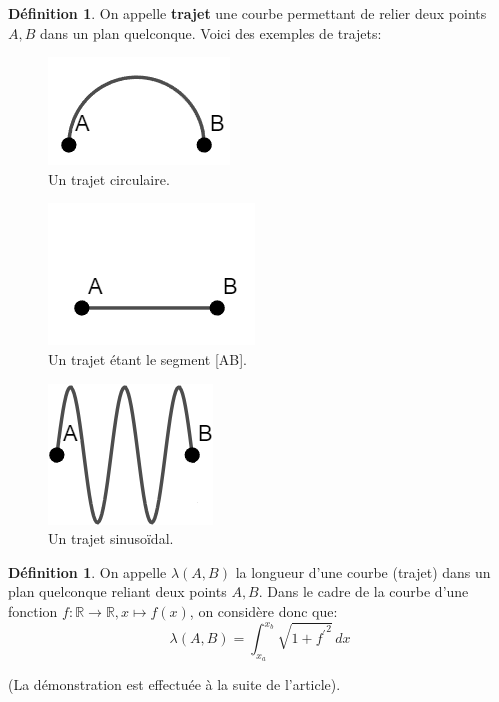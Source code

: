 \documentclass{amsart}
\theoremstyle{definition}
\newtheorem{definition}[theorem]{Définition}
\theoremstyle{remark}
\numberwithin{equation}{section}
\begin{document}
\begin{definition}
  On appelle \textbf{trajet} une courbe permettant de relier deux points $A,B$ dans un plan quelconque. Voici des exemples de trajets:

  \begin{figure}[H]
    \centering
    \includegraphics[scale=0.5]{circle.png}
    \caption{Un trajet circulaire.}
  \end{figure}

  \begin{figure}[H]
    \centering
    \includegraphics[scale=0.5]{line.png}
    \caption{Un trajet étant le segment [AB].}
  \end{figure}

  \begin{figure}[H]
    \centering
    \includegraphics[scale=0.5]{sinus.png}
    \caption{Un trajet sinusoïdal.}
  \end{figure}
\end{definition}

\begin{definition}
  On appelle $\lambda(A,B)$ la longueur d'une courbe (trajet) dans un plan quelconque reliant deux points $A,B$. Dans le cadre de la courbe d'une fonction $f:\mathbb{R}\longrightarrow \mathbb{R}, x\longmapsto f(x)$,
  on considère donc que: \[\lambda(A,B)=\int_{x_a}^{x_b} \sqrt{1+{f^\prime}^2} \,dx\]
  
  (La démonstration est effectuée à la suite de l'article).
\end{definition}
\end{document}
